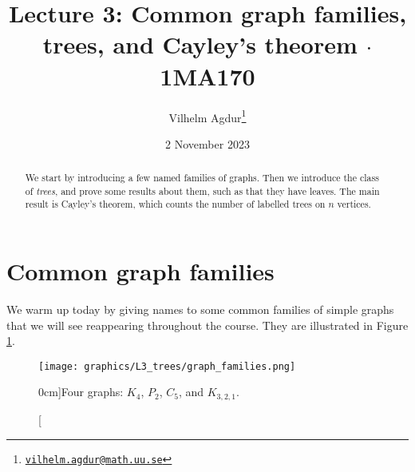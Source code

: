 \documentclass[nobib]{tufte-handout}
\title{Lecture 3: Common graph families, trees, and Cayley's theorem $\cdot$ 1MA170}
\author[Vilhelm Agdur]{Vilhelm Agdur\thanks{\href{mailto:vilhelm.agdur@math.uu.se}{\nolinkurl{vilhelm.agdur@math.uu.se}}}}
\date{2 November 2023}
\begin{document}
\maketitle%

\begin{abstract}
\noindent
We start by introducing a few named families of graphs. Then we introduce the class of \emph{trees}, and prove some results about them, such as that they have leaves. The main result is Cayley's theorem, which counts the number of labelled trees on $n$ vertices.
\end{abstract}

\section{Common graph families}

We warm up today by giving names to some common families of simple graphs that we will see reappearing throughout the course. They are illustrated in Figure \ref{fig:graph_families}.

\begin{figure}
  \centering
  \texttt{[image: graphics/L3\_trees/graph\_families.png]}
  \caption[][0cm]{Four graphs: $K_4$, $P_2$, $C_5$, and $K_{3,2,1}$.}
  \label{fig:graph_families}
\end{figure}
\end{document}
